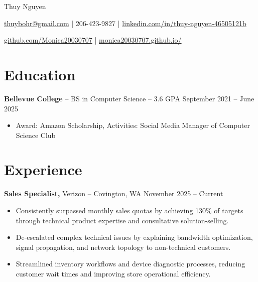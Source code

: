 \documentclass[11pt]{article}       %
\begin{document}
\centerline{\Huge Thuy Nguyen}

\vspace{5pt}

\centerline{\href{mailto:thuybohr@gmail.com}{thuybohr@gmail.com} | 206-423-9827 |
\href{https://www.linkedin.com/in/thuy-nguyen-46505121b/}{linkedin.com/in/thuy-nguyen-46505121b}}

\centerline{\href{https://github.com/Monica20030707}{github.com/Monica20030707} | 
\href{https://monica20030707.github.io/}{monica20030707.github.io/}} 

\vspace{-9pt}

\section*{Education}
\textbf{Bellevue College} -- BS in Computer Science -- 3.6 GPA \hfill September 2021 -- June 2025\\
\vspace{-9pt}
\begin{itemize}
  \item Award: Amazon Scholarship, Activities: Social Media Manager of Computer Science Club
\end{itemize}

\vspace{-18.5pt}

\section*{Experience}

\textbf{Sales Specialist,} {Verizon} -- Covington, WA \hfill November 2025 -- Current \\
\vspace{-9pt}
\begin{itemize}
  \item Consistently surpassed monthly sales quotas by achieving 130\% of targets through technical product expertise and consultative solution-selling.
  \item De-escalated complex technical issues by explaining bandwidth optimization, signal propagation, and network topology to non-technical customers.
  \item Streamlined inventory workflows and device diagnostic processes, reducing customer wait times and improving store operational efficiency.
\end{itemize}
\end{document}
